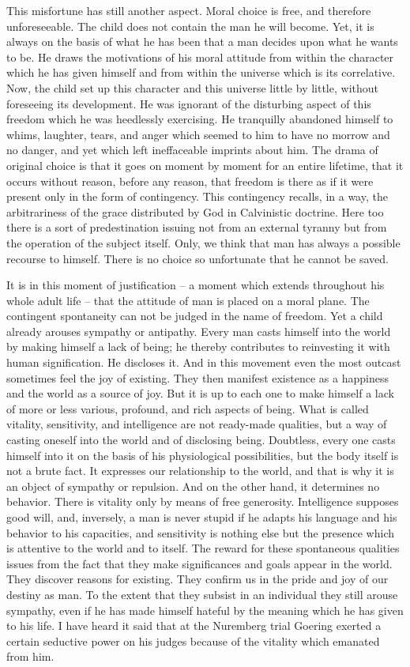 \documentclass[11pt]{article}
\begin{document}
This misfortune has still another aspect. Moral choice is free, and therefore unforeseeable. The child does not contain the man he will become. Yet, it is always on the basis of what he has been that a man decides upon what he wants to be. He draws the motivations of his moral attitude from within the character which he has given himself and from within the universe which is its correlative. Now, the child set up this character and this universe little by little, without foreseeing its development. He was ignorant of the disturbing aspect of this freedom which he was heedlessly exercising. He tranquilly abandoned himself to whims, laughter, tears, and anger which seemed to him to have no morrow and no danger, and yet which left ineffaceable imprints about him. The drama of original choice is that it goes on moment by moment for an entire lifetime, that it occurs without reason, before any reason, that freedom is there as if it were present only in the form of contingency. This contingency recalls, in a way, the arbitrariness of the grace distributed by God in Calvinistic doctrine. Here too there is a sort of predestination issuing not from an external tyranny but from the operation of the subject itself. Only, we think that man has always a possible recourse to himself. There is no choice so unfortunate that he cannot be saved.

It is in this moment of justification – a moment which extends throughout his whole adult life – that the attitude of man is placed on a moral plane. The contingent spontaneity can not be judged in the name of freedom. Yet a child already arouses sympathy or antipathy. Every man casts himself into the world by making himself a lack of being; he thereby contributes to reinvesting it with human signification. He discloses it. And in this movement even the most outcast sometimes feel the joy of existing. They then manifest existence as a happiness and the world as a source of joy. But it is up to each one to make himself a lack of more or less various, profound, and rich aspects of being. What is called vitality, sensitivity, and intelligence are not ready-made qualities, but a way of casting oneself into the world and of disclosing being. Doubtless, every one casts himself into it on the basis of his physiological possibilities, but the body itself is not a brute fact. It expresses our relationship to the world, and that is why it is an object of sympathy or repulsion. And on the other hand, it determines no behavior. There is vitality only by means of free generosity. Intelligence supposes good will, and, inversely, a man is never stupid if he adapts his language and his behavior to his capacities, and sensitivity is nothing else but the presence which is attentive to the world and to itself. The reward for these spontaneous qualities issues from the fact that they make significances and goals appear in the world. They discover reasons for existing. They confirm us in the pride and joy of our destiny as man. To the extent that they subsist in an individual they still arouse sympathy, even if he has made himself hateful by the meaning which he has given to his life. I have heard it said that at the Nuremberg trial Goering exerted a certain seductive power on his judges because of the vitality which emanated from him.
\end{document}
